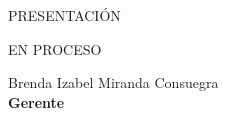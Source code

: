 \begin{center}
{\Bold \LARGE \color{color3} PRESENTACIÓN}\\[2cm]
\end{center}

EN PROCESO
\begin{center}
Brenda Izabel Miranda Consuegra\\
\textbf{Gerente}
\end{center}

